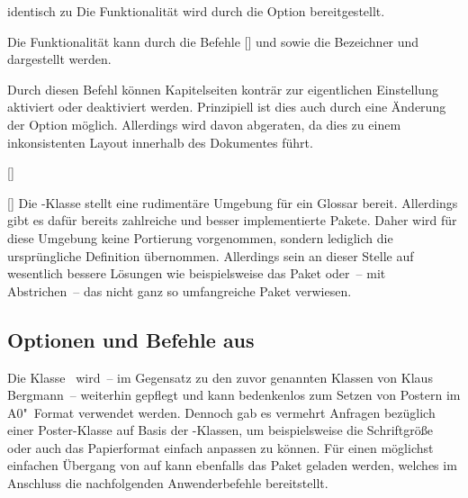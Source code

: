 \begin{Bundle*}{}
\begin{Declaration}{}{%
  identisch zu %
}
\printdeclarationlist%
%
Die Funktionalität wird durch die Option  bereitgestellt.
\end{Declaration}

\begin{Declaration}{}
\printdeclarationlist%
%
Die Funktionalität kann durch die Befehle [] 
und  sowie die Bezeichner  und 
 dargestellt werden.
\end{Declaration}

\begin{Declaration}{}
\printdeclarationlist%
%
Durch diesen Befehl können Kapitelseiten konträr zur eigentlichen Einstellung 
aktiviert oder deaktiviert werden. Prinzipiell ist dies auch durch eine 
Änderung der Option  möglich. Allerdings wird davon 
abgeraten, da dies zu einem inkonsistenten Layout innerhalb des Dokumentes 
führt.
\end{Declaration}

\begin{Declaration}{[]}
\begin{Declaration}{[]}
\printdeclarationlist%
%
Die -Klasse stellt eine rudimentäre Umgebung für ein Glossar 
bereit. Allerdings gibt es dafür bereits zahlreiche und besser implementierte 
Pakete. Daher wird für diese Umgebung keine Portierung vorgenommen, sondern 
lediglich die ursprüngliche Definition übernommen. Allerdings sein an dieser 
Stelle auf wesentlich bessere Lösungen wie beispielsweise das Paket 
 oder~-- mit Abstrichen~-- das nicht ganz so umfangreiche 
Paket  verwiesen.
\end{Declaration}
\end{Declaration}
%

\subsection{Optionen und Befehle aus }
%
%
Die Klasse~ wird~-- im Gegensatz zu den zuvor genannten 
Klassen von Klaus Bergmann~-- weiterhin gepflegt und kann bedenkenlos zum 
Setzen von Postern im A0"~Format verwendet werden. Dennoch gab es vermehrt 
Anfragen bezüglich einer Poster-Klasse auf Basis der \TUDScript-Klassen, um 
beispielsweise die Schriftgröße oder auch das Papierformat einfach anpassen zu 
können. Für einen möglichst einfachen Übergang von  auf 
 kann ebenfalls das Paket  geladen 
werden, welches im Anschluss die nachfolgenden Anwenderbefehle bereitstellt.


\end{Bundle*}

